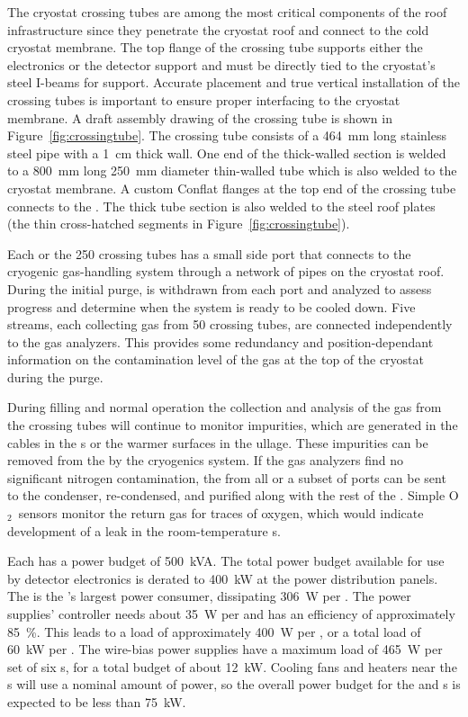 The cryostat crossing tubes are among the most critical components of the roof infrastructure since they penetrate the cryostat roof and connect to the cold cryostat membrane. The top flange of the crossing tube supports either the electronics \fdth or the detector support \fdth and must be directly tied to the cryostat's steel I-beams for support. 
Accurate placement and true vertical installation of the crossing tubes is important to ensure proper interfacing to the cryostat membrane. 
A draft assembly drawing of the crossing tube is shown in Figure~\ref{fig:crossingtube}. 
The crossing tube consists of a \SI{464}{mm} long stainless steel pipe with a \SI{1}{cm} thick wall. 
One end of the thick-walled section is welded to a \SI{800}{mm} long \SI{250}{mm} diameter thin-walled tube which is also welded to the cryostat membrane.
A custom Conflat flanges at the top end of the crossing tube connects to the \fdth. 
The thick tube section is also welded to the steel roof plates (the thin cross-hatched segments in Figure~\ref{fig:crossingtube}).  

 
Each or the 250 crossing tubes has a small side port that connects to the cryogenic gas-handling system through a network of pipes on the cryostat roof. During the initial  purge,   is withdrawn from each port and analyzed to assess progress and determine when the system is ready to be cooled down. Five  streams, each collecting gas from 50 crossing tubes, are connected independently to the gas analyzers. This provides some redundancy and position-dependant information on the contamination level of the gas at the top of the cryostat during the purge.
 
During filling and normal operation the collection and analysis of the gas from the crossing tubes will continue to monitor impurities, which are generated in the cables in the \fdth{}s or the warmer surfaces in the ullage. These impurities can be removed from the  by the cryogenics system.
If the gas analyzers find no significant nitrogen contamination, the  from all or a subset of ports can be sent to the condenser, re-condensed, and purified along with the rest of the . Simple O$_2$\ sensors monitor the return gas for traces of oxygen, which would indicate development of a leak in the room-temperature \fdth{}s.

Each  has a power budget of \SI{500}{kVA}. The total power budget available for use by detector electronics is derated to \SI{400}{kW} at the power distribution panels.  
The  is the 's largest power consumer,  dissipating \SI{306}{W} per .  
The  power supplies' controller needs about \SI{35}{W} per  and has an efficiency of approximately \SI{85}{\%}. 
This leads to a load of  approximately  \SI{400}{W}  per , or a total load of  \SI{60}{kW} per .  
The  wire-bias power supplies have a maximum load of  \SI{465}{W} per set of six s, for a total budget of about   \SI{12}{kW}.   
Cooling fans and heaters near the \fdth{}s will use a nominal amount of power, so the overall power budget for the  and  s is expected to be less than \SI{75}{kW}.

